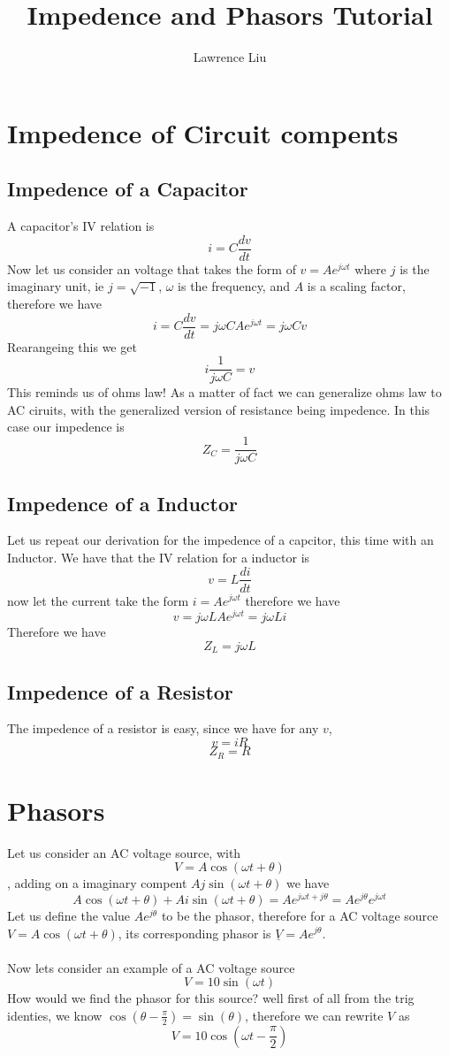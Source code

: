\documentclass[12pt]{article}
\title{Impedence and Phasors Tutorial}
\author{Lawrence Liu}
\begin{document}
\maketitle

\section*{Impedence of Circuit compents}

\subsection*{Impedence of a Capacitor}
A capacitor's IV relation is 
$$i=C\frac{dv}{dt}$$
Now let us consider an voltage that takes the form of $v=Ae^{j\omega t}$ where
$j$ is the imaginary unit, ie $j=\sqrt{-1}$, $\omega$ is the frequency, and $A$ is a scaling factor, therefore we have
$$i=C\frac{dv}{dt}=j\omega C Ae^{j\omega t}=j\omega Cv$$
Rearangeing this we get
$$i\frac{1}{j\omega C}=v$$
This reminds us of ohms law! As a matter of fact we can generalize ohms law to AC ciruits, with the
generalized version of resistance being impedence. In this case our impedence is
$$Z_C=\frac{1}{j\omega C}$$
\subsection*{Impedence of a Inductor}
Let us repeat our derivation for the impedence of a capcitor, this time with an Inductor. We have
that the IV relation for a inductor is
$$v=L\frac{di}{dt}$$
now let the current take the form $i=Ae^{j\omega t}$
therefore we have
$$v=j\omega L Ae^{j\omega t}=j\omega L i$$
Therefore we have
$$Z_L=j\omega L$$
\subsection*{Impedence of a Resistor}
The impedence of a resistor is easy, since we have for any $v$,
$$v=iR$$
$$Z_R=R$$
\section*{Phasors}
Let us consider an AC voltage source, with
$$V=A\cos(\omega t+\theta)$$,
adding on a imaginary compent $A j \sin(\omega t +\theta)$ we have
$$A\cos(\omega t+\theta)+A i \sin(\omega t +\theta)=Ae^{j\omega t+j\theta}=Ae^{j\theta}e^{j\omega t}
$$
Let us define the value $Ae^{j\theta}$ to be the phasor, therefore for a AC voltage source
$V=A\cos(\omega t+\theta)$, its corresponding phasor is $\underline{V}=Ae^{j\theta}$.\\
\\
Now lets consider an example of a AC voltage source
$$V=10\sin(\omega t)$$
How would we find the phasor for this source? well first of all from the trig identies, we know
$\cos(\theta-\frac{\pi}{2})=\sin(\theta)$, therefore we can rewrite $V$ as 
$$V=10\cos(\omega t-\frac{\pi}{2})$$
\end{document}
